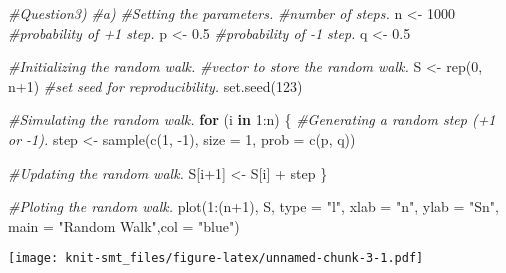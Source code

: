 \documentclass[
]{article}
\newenvironment{Shaded}{\begin{snugshade}}{\end{snugshade}}
\newcommand{\AttributeTok}[1]{\textcolor[rgb]{0.77,0.63,0.00}{#1}}
\newcommand{\CommentTok}[1]{\textcolor[rgb]{0.56,0.35,0.01}{\textit{#1}}}
\newcommand{\ControlFlowTok}[1]{\textcolor[rgb]{0.13,0.29,0.53}{\textbf{#1}}}
\newcommand{\DecValTok}[1]{\textcolor[rgb]{0.00,0.00,0.81}{#1}}
\newcommand{\FloatTok}[1]{\textcolor[rgb]{0.00,0.00,0.81}{#1}}
\newcommand{\FunctionTok}[1]{\textcolor[rgb]{0.00,0.00,0.00}{#1}}
\newcommand{\NormalTok}[1]{#1}
\newcommand{\OtherTok}[1]{\textcolor[rgb]{0.56,0.35,0.01}{#1}}
\newcommand{\SpecialCharTok}[1]{\textcolor[rgb]{0.00,0.00,0.00}{#1}}
\newcommand{\StringTok}[1]{\textcolor[rgb]{0.31,0.60,0.02}{#1}}
\begin{document}
\begin{Shaded}
\begin{Highlighting}[]
\CommentTok{\#Question3)}
\CommentTok{\#a)}
\CommentTok{\#Setting the parameters.}
\CommentTok{\#number of steps.}
\NormalTok{n }\OtherTok{\textless{}{-}} \DecValTok{1000} 
\CommentTok{\#probability of +1 step.}
\NormalTok{p }\OtherTok{\textless{}{-}} \FloatTok{0.5} 
\CommentTok{\#probability of {-}1 step.}
\NormalTok{q }\OtherTok{\textless{}{-}} \FloatTok{0.5} 

\CommentTok{\#Initializing the random walk.}
\CommentTok{\#vector to store the random walk.}
\NormalTok{S }\OtherTok{\textless{}{-}} \FunctionTok{rep}\NormalTok{(}\DecValTok{0}\NormalTok{, n}\SpecialCharTok{+}\DecValTok{1}\NormalTok{) }
\CommentTok{\#set seed for reproducibility.}
\FunctionTok{set.seed}\NormalTok{(}\DecValTok{123}\NormalTok{) }

\CommentTok{\#Simulating the random walk.}
\ControlFlowTok{for}\NormalTok{ (i }\ControlFlowTok{in} \DecValTok{1}\SpecialCharTok{:}\NormalTok{n) \{}
  \CommentTok{\#Generating a random step (+1 or {-}1).}
\NormalTok{  step }\OtherTok{\textless{}{-}} \FunctionTok{sample}\NormalTok{(}\FunctionTok{c}\NormalTok{(}\DecValTok{1}\NormalTok{, }\SpecialCharTok{{-}}\DecValTok{1}\NormalTok{), }\AttributeTok{size =} \DecValTok{1}\NormalTok{, }\AttributeTok{prob =} \FunctionTok{c}\NormalTok{(p, q))}
  
  \CommentTok{\#Updating the random walk.}
\NormalTok{  S[i}\SpecialCharTok{+}\DecValTok{1}\NormalTok{] }\OtherTok{\textless{}{-}}\NormalTok{ S[i] }\SpecialCharTok{+}\NormalTok{ step}
\NormalTok{\}}

\CommentTok{\#Ploting the random walk.}
\FunctionTok{plot}\NormalTok{(}\DecValTok{1}\SpecialCharTok{:}\NormalTok{(n}\SpecialCharTok{+}\DecValTok{1}\NormalTok{), S, }\AttributeTok{type =} \StringTok{"l"}\NormalTok{, }\AttributeTok{xlab =} \StringTok{"n"}\NormalTok{, }\AttributeTok{ylab =} \StringTok{"Sn"}\NormalTok{, }\AttributeTok{main =} \StringTok{"Random Walk"}\NormalTok{,}\AttributeTok{col =} \StringTok{"blue"}\NormalTok{)}
\end{Highlighting}
\end{Shaded}

\texttt{[image: knit-smt\_files/figure-latex/unnamed-chunk-3-1.pdf]}
\end{document}
